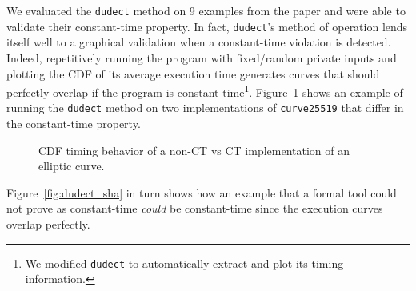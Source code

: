 We evaluated the \texttt{dudect} method on 9 examples from the \ctVerif paper and were able to validate their constant-time property.
In fact, \texttt{dudect}'s method of operation lends itself well to a graphical validation when a constant-time violation is detected.
Indeed, repetitively running the program with fixed/random private inputs and plotting the CDF of its average execution time generates curves that should perfectly overlap if the program is constant-time\footnote{We modified \texttt{dudect} to automatically extract and plot its timing information.}.
Figure~\ref{fig:dudect_donna} shows an example of running the \texttt{dudect} method on two implementations of \texttt{curve25519} that differ in the constant-time property.

\begin{figure}[h!]
  \centering
  \label{fig:dudect_donnabad}
  \label{fig:dudect_donnagood}
  \caption{CDF timing behavior of a non-CT vs CT implementation of an elliptic curve.}
  \label{fig:dudect_donna}
\end{figure}

Figure~\ref{fig:dudect_sha} in turn shows how an example that a formal tool could not prove as constant-time \emph{could} be constant-time since the execution curves overlap perfectly.

